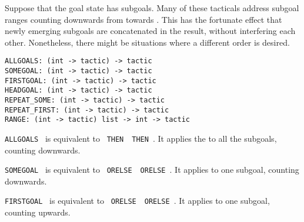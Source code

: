 \begin{isabellebody}
\begin{isamarkuptext}
  Suppose that the goal state has  subgoals.  Many of
  these tacticals address subgoal ranges counting downwards from
   towards .  This has the fortunate effect that
  newly emerging subgoals are concatenated in the result, without
  interfering each other.  Nonetheless, there might be situations
  where a different order is desired.%
\end{isamarkuptext}%
\isamarkuptrue%
%
\isadelimmlref
%
\endisadelimmlref
%
\isatagmlref
%
\begin{isamarkuptext}%
\begin{mldecls}
  \verb|ALLGOALS: (int -> tactic) -> tactic| \\
  \verb|SOMEGOAL: (int -> tactic) -> tactic| \\
  \verb|FIRSTGOAL: (int -> tactic) -> tactic| \\
  \verb|HEADGOAL: (int -> tactic) -> tactic| \\
  \verb|REPEAT_SOME: (int -> tactic) -> tactic| \\
  \verb|REPEAT_FIRST: (int -> tactic) -> tactic| \\
  \verb|RANGE: (int -> tactic) list -> int -> tactic| \\
  \end{mldecls}

  \begin{description}

  \item \verb|ALLGOALS|~ is equivalent to ~\verb|THEN|~~\verb|THEN|~.  It
  applies the  to all the subgoals, counting downwards.

  \item \verb|SOMEGOAL|~ is equivalent to ~\verb|ORELSE|~~\verb|ORELSE|~.  It
  applies  to one subgoal, counting downwards.

  \item \verb|FIRSTGOAL|~ is equivalent to ~\verb|ORELSE|~~\verb|ORELSE|~.  It
  applies  to one subgoal, counting upwards.


\end{description}
\end{isamarkuptext}
\end{isabellebody}
